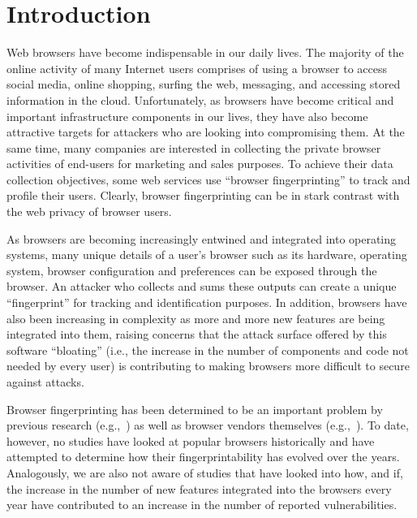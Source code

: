 \section{Introduction}
\label{sec:introduction}

Web browsers have become indispensable in our daily lives. The
majority of the online activity of many Internet users comprises of
using a browser to access social media, online shopping, surfing the
web, messaging, and accessing stored information in the cloud.
Unfortunately, as browsers have become critical and important
infrastructure components in our lives, they have also become
attractive targets for attackers who are looking into compromising
them. At the same time, many companies are interested in collecting
the private browser activities of end-users for marketing and sales
purposes. To achieve their data collection objectives, some web
services use ``browser fingerprinting'' to track and profile their
users. Clearly, browser fingerprinting can be in stark contrast with
the web privacy of browser users.

As browsers are becoming increasingly entwined and integrated into
operating systems, many unique details of a user's browser such as its
hardware, operating system, browser configuration and preferences can be
exposed through the browser. An attacker who collects and sums these
outputs can create a unique ``fingerprint'' for tracking and
identification purposes. In addition, browsers have also been
increasing in complexity as more and more new features are being
integrated into them, raising concerns that the attack surface offered
by this software ``bloating'' (i.e., the increase in the number of
components and code not needed by every user) is contributing to
making browsers more difficult to secure against attacks.

Browser fingerprinting has been determined to be an important problem
by previous research (e.g.,~\cite{cookielessmonster,panopticlick,mowery2012pixel,fpdetective}) as well as browser vendors
themselves (e.g.,~\cite{safari-privacy, brave-fpbudget, firefox-fingerprinting}). To date, however, no studies have looked
at popular browsers historically and have attempted to determine how
their fingerprintability has evolved over the years. Analogously, we
are also not aware of studies that have looked into how, and if, the
increase in the number of new features integrated into the browsers
every year have contributed to an increase in the number of reported
vulnerabilities.

